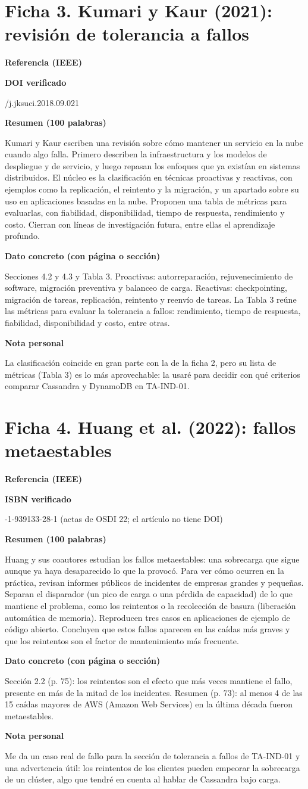 \documentclass[11pt,a4paper]{article}
\newcommand{\campo}[1]{\par\medskip\noindent\textbf{#1}\par\smallskip}
\begin{document}
	\section*{Ficha 3. Kumari y Kaur (2021): revisi\'on de tolerancia a fallos}
	\campo{Referencia (IEEE)}
	\campo{DOI verificado}
	10.1016/j.jksuci.2018.09.021
	\campo{Resumen (100 palabras)}
	Kumari y Kaur escriben una revisión sobre cómo mantener un servicio en la nube cuando algo falla. Primero describen la infraestructura y los modelos de despliegue y de servicio, y luego repasan los enfoques que ya existían en sistemas distribuidos. El núcleo es la clasificación en técnicas proactivas y reactivas, con ejemplos como la replicación, el reintento y la migración, y un apartado sobre su uso en aplicaciones basadas en la nube. Proponen una tabla de métricas para evaluarlas, con fiabilidad, disponibilidad, tiempo de respuesta, rendimiento y costo. Cierran con líneas de investigación futura, entre ellas el aprendizaje profundo.
	\campo{Dato concreto (con p\'agina o secci\'on)}
	Secciones 4.2 y 4.3 y Tabla 3. Proactivas: autorreparación, rejuvenecimiento de software, migración preventiva y balanceo de carga. Reactivas: checkpointing, migración de tareas, replicación, reintento y reenvío de tareas. La Tabla 3 reúne las métricas para evaluar la tolerancia a fallos: rendimiento, tiempo de respuesta, fiabilidad, disponibilidad y costo, entre otras.
	\campo{Nota personal}
	La clasificación coincide en gran parte con la de la ficha 2, pero su lista de métricas (Tabla 3) es lo más aprovechable: la usaré para decidir con qué criterios comparar Cassandra y DynamoDB en TA-IND-01.
	
	\section*{Ficha 4. Huang et al. (2022): fallos metaestables}
	\campo{Referencia (IEEE)}
	\campo{ISBN verificado}
	978-1-939133-28-1 (actas de OSDI 22; el art\'iculo no tiene DOI)
	\campo{Resumen (100 palabras)}
	Huang y sus coautores estudian los fallos metaestables: una sobrecarga que sigue aunque ya haya desaparecido lo que la provocó. Para ver cómo ocurren en la práctica, revisan informes públicos de incidentes de empresas grandes y pequeñas. Separan el disparador (un pico de carga o una pérdida de capacidad) de lo que mantiene el problema, como los reintentos o la recolección de basura (liberación automática de memoria). Reproducen tres casos en aplicaciones de ejemplo de código abierto. Concluyen que estos fallos aparecen en las caídas más graves y que los reintentos son el factor de mantenimiento más frecuente.
	\campo{Dato concreto (con p\'agina o secci\'on)}
	Sección 2.2 (p. 75): los reintentos son el efecto que más veces mantiene el fallo, presente en más de la mitad de los incidentes. Resumen (p. 73): al menos 4 de las 15 caídas mayores de AWS (Amazon Web Services) en la última década fueron metaestables.
	\campo{Nota personal}
	Me da un caso real de fallo para la sección de tolerancia a fallos de TA-IND-01 y una advertencia útil: los reintentos de los clientes pueden empeorar la sobrecarga de un clúster, algo que tendré en cuenta al hablar de Cassandra bajo carga.
	
\end{document}
